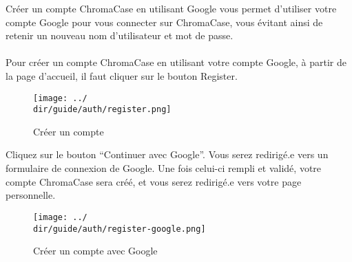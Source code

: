 Créer un compte ChromaCase en utilisant Google vous permet d’utiliser votre compte Google pour vous connecter sur ChromaCase, vous évitant ainsi de retenir un nouveau nom d’utilisateur et mot de passe.
\\\\
Pour créer un compte ChromaCase en utilisant votre compte Google, à partir de la page d’accueil, il faut cliquer sur le bouton Register.

\begin{figure}[H]
	\texttt{[image: ../\\dir/guide/auth/register.png]}
	\caption{Créer un compte}
\end{figure}

Cliquez sur le bouton “Continuer avec Google”. Vous serez redirigé.e vers un formulaire de connexion de Google. Une fois celui-ci rempli et validé, votre compte ChromaCase sera créé, et vous serez redirigé.e vers votre page personnelle.

\begin{figure}[H]
	\begin{center}
		\texttt{[image: ../\\dir/guide/auth/register-google.png]}
	\end{center}
	\caption{Créer un compte avec Google}
\end{figure}